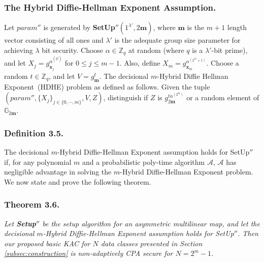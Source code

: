 \subsubsection{The Hybrid Diffie-Hellman Exponent Assumption.} Let $param''$ is generated by \textbf{SetUp}$''(1^{\lambda'},2\mathbf{m})$, where $\mathbf{m}$ is the $m+1$ length vector consisting of all ones and $\lambda'$ is the adequate group size parameter for achieving $\lambda$ bit security. Choose $\alpha \in \mathbb{Z}_q$ at random (where $q$ is a $\lambda'$-bit prime), and let $X_j=g^{\alpha^{(2^j)}}_{\mathbf{x}_j}$ for $0\leq j \leq m-1$. Also, define $X_m=g^{\alpha^{(2^m+1)}}_{\mathbf{x}_m}$. Choose a random $t\in\mathbb{Z}_q$, and let $V=g^{t}_{\mathbf{m}}$. The decisional $m$-Hybrid Diffie Hellman Exponent~(HDHE) problem as defined as follows. Given the tuple $(param'',\{X_j\}_{j\in\{0,\cdots,m\}},V,Z)$, distinguish if $Z$ is $g^{t\alpha^{(2^m)}}_{2\mathbf{m}}$ or a random element of $\mathbb{G}_{2\mathbf{m}}$.

\subsubsection{Definition 3.5.} The decisional $m$-Hybrid Diffie-Hellman Exponent assumption holds for {SetUp}$''$ if, for any polynomial $m$ and a probabilistic poly-time algorithm $\mathcal{A}$, $\mathcal{A}$ has negligible advantage in solving the $m$-Hybrid Diffie-Hellman Exponent problem.\\

\noindent We now state and prove the following theorem.

\subsubsection{Theorem 3.6.} \textit{Let \textbf{Setup}$''$ be the setup algorithm for an asymmetric multilinear map, and let the decisional $m$-Hybrid Diffie-Hellman Exponent assumption holds for {SetUp}$''$. Then our proposed basic KAC for $N$ data classes presented in Section \ref{subsec:construction} is non-adaptively CPA secure for $N=2^m-1$.}


